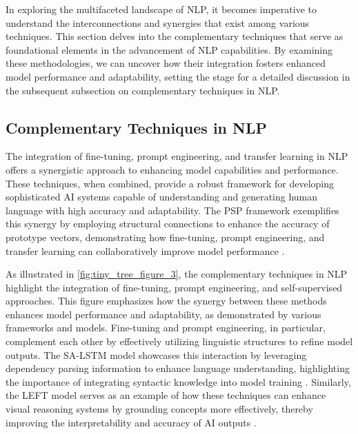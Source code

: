 In exploring the multifaceted landscape of NLP, it becomes imperative to understand the interconnections and synergies that exist among various techniques. This section delves into the complementary techniques that serve as foundational elements in the advancement of NLP capabilities. By examining these methodologies, we can uncover how their integration fosters enhanced model performance and adaptability, setting the stage for a detailed discussion in the subsequent subsection on complementary techniques in NLP.






\subsection{Complementary Techniques in NLP} \label{subsec:Complementary Techniques in NLP}

The integration of fine-tuning, prompt engineering, and transfer learning in NLP offers a synergistic approach to enhancing model capabilities and performance. These techniques, when combined, provide a robust framework for developing sophisticated AI systems capable of understanding and generating human language with high accuracy and adaptability. The PSP framework exemplifies this synergy by employing structural connections to enhance the accuracy of prototype vectors, demonstrating how fine-tuning, prompt engineering, and transfer learning can collaboratively improve model performance \cite{ge2024psppretrainingstructureprompt}.

As illustrated in \autoref{fig:tiny_tree_figure_3}, the complementary techniques in NLP highlight the integration of fine-tuning, prompt engineering, and self-supervised approaches. This figure emphasizes how the synergy between these methods enhances model performance and adaptability, as demonstrated by various frameworks and models. Fine-tuning and prompt engineering, in particular, complement each other by effectively utilizing linguistic structures to refine model outputs. The SA-LSTM model showcases this interaction by leveraging dependency parsing information to enhance language understanding, highlighting the importance of integrating syntactic knowledge into model training \cite{qian2017syntaxawarelstmmodel}. Similarly, the LEFT model serves as an example of how these techniques can enhance visual reasoning systems by grounding concepts more effectively, thereby improving the interpretability and accuracy of AI outputs \cite{hsu2023whatsleftconceptgrounding}.

